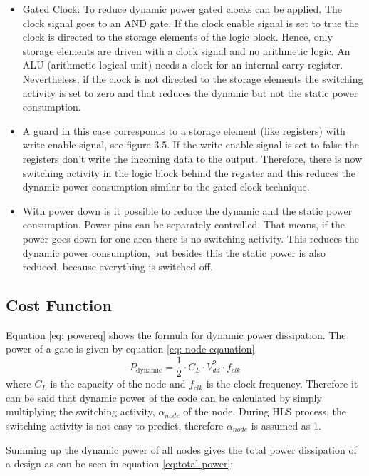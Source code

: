 \documentclass[conference]{IEEEtran}
\begin{document}
\begin{itemize}
    \item Gated Clock: To reduce dynamic power gated clocks can be applied. The clock signal goes to an AND gate. If the clock enable signal is set to true the clock is directed to the storage elements of the logic block. Hence, only storage elements are driven with a clock signal and no arithmetic logic. An ALU (arithmetic logical unit) needs a clock for an internal carry register. Nevertheless, if the clock is not directed to the storage elements the switching activity is set to zero and that reduces the dynamic but not the static power consumption.
    \item A guard in this case corresponds to a storage element (like registers) with write enable signal, see figure 3.5. If the write enable signal is set to false the registers don’t write the incoming data to the output. Therefore, there is now switching activity in the logic block behind the register and this reduces the dynamic power consumption similar to the gated clock technique.
    \item With power down is it possible to reduce the dynamic and the static power consumption. Power pins can be separately controlled. That means, if the power goes down for one area there is no switching activity. This reduces the dynamic power consumption, but besides this the static power is also reduced, because everything is switched off.
\end{itemize}

\subsection{Cost Function}
\label{subsec: cost function}
Equation \ref{eq: powereq} shows the formula for dynamic power dissipation. The power of a gate is given by equation \ref{eq: node eqauation}
\begin{equation}
P_{\text{dynamic}} = \frac{1}{2} \cdot C_L \cdot V_{dd}^2  \cdot f_{clk}
\label{eq: node eqauation}
\end{equation}
where $C_L$ is the capacity of the node and $f_{clk}$ is the clock frequency. Therefore it can be said that dynamic power of the code can be calculated by simply multiplying the switching activity, $\alpha_{node}$ of the node. During HLS process, the switching activity is not easy to predict, therefore $\alpha_{node}$ is assumed as 1. 

Summing up the dynamic power of all nodes gives the total power dissipation of a design as can be seen in equation \ref{eq:total power}:
\end{document}

